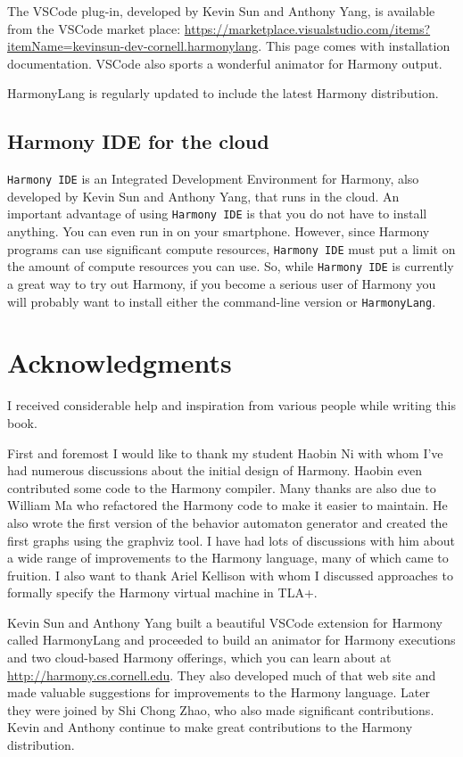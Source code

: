 \documentclass{report}
\begin{document}
The VSCode plug-in, developed by Kevin Sun and Anthony Yang,
is available from the VSCode market place: \url{https://marketplace.visualstudio.com/items?itemName=kevinsun-dev-cornell.harmonylang}.
This page comes with installation documentation.  VSCode also sports a
wonderful animator for Harmony output.

HarmonyLang is regularly updated to include the latest Harmony distribution.

\section{Harmony IDE for the cloud}

\texttt{Harmony IDE} is an Integrated Development Environment for Harmony,
also developed by Kevin Sun and Anthony Yang,
that runs in the cloud.  An important advantage of using \texttt{Harmony IDE}
is that you do not have to install anything.  You can even run in on your
smartphone.  However, since Harmony programs can use significant compute
resources, \texttt{Harmony IDE} must put a limit on the amount of compute
resources you can use.  So, while \texttt{Harmony IDE} is currently a great
way to try out Harmony, if you become a serious user of Harmony you
will probably want to install either the command-line version or
\texttt{HarmonyLang}.

\cleardoublepage
{}
{}
\chapter*{Acknowledgments}

I received considerable help and inspiration from various people
while writing this book.

First and foremost I would like to thank my student Haobin Ni with
whom I've had numerous discussions about the initial design of Harmony.
Haobin even contributed some code to the Harmony compiler.
Many thanks are also due to William Ma who refactored the Harmony code
to make it easier to maintain.
He also wrote the first version of the behavior automaton generator
and created the first graphs using the graphviz tool.
I have had lots of discussions with him about a wide range of
improvements to the Harmony language, many of which came to fruition.
I also want to thank Ariel Kellison with whom I discussed approaches
to formally specify the Harmony virtual machine in TLA+.

Kevin Sun and Anthony Yang built a beautiful VSCode extension for Harmony
called HarmonyLang and proceeded to build an animator for Harmony
executions and two cloud-based Harmony offerings, which you can learn
about at \url{http://harmony.cs.cornell.edu}.  They also developed much of
that web site and made valuable suggestions for improvements to the
Harmony language.  Later they were joined by Shi Chong Zhao, who also
made significant contributions.  Kevin and Anthony continue to make
great contributions to the Harmony distribution.
\end{document}
